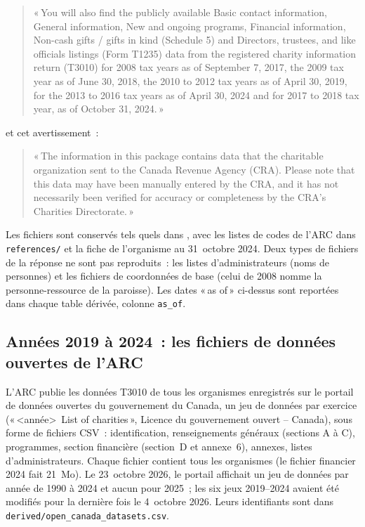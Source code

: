 \documentclass[11pt,letterpaper]{article}
\begin{document}
\begin{quote}\small
«\,You will also find the publicly available Basic contact information, General information, New and ongoing programs, Financial information, Non-cash gifts / gifts in kind (Schedule 5) and Directors, trustees, and like officials listings (Form T1235) data from the registered charity information return (T3010) for 2008 tax years as of September 7, 2017, the 2009 tax year as of June 30, 2018, the 2010 to 2012 tax years as of April 30, 2019, for the 2013 to 2016 tax years as of April 30, 2024 and for 2017 to 2018 tax year, as of October 31, 2024.\,»
\end{quote}

et cet avertissement~:

\begin{quote}\small
«\,The information in this package contains data that the charitable organization sent to the Canada Revenue Agency (CRA). Please note that this data may have been manually entered by the CRA, and it has not necessarily been verified for accuracy or completeness by the CRA's Charities Directorate.\,»
\end{quote}

Les fichiers sont conservés tels quels dans , avec les listes de codes de l'ARC dans \texttt{references/} et la fiche de l'organisme au 31~octobre 2024. Deux types de fichiers de la réponse ne sont pas reproduits~: les listes d'administrateurs (noms de personnes) et les fichiers de coordonnées de base (celui de 2008 nomme la personne-ressource de la paroisse). Les dates «\,as of\,» ci-dessus sont reportées dans chaque table dérivée, colonne \texttt{as\_of}.

\subsection{Années 2019 à 2024~: les fichiers de données ouvertes de l'ARC}\label{sec:open}

L'ARC publie les données T3010 de tous les organismes enregistrés sur le portail de données ouvertes du gouvernement du Canada, un jeu de données par exercice («\,\textless année\textgreater\ List of charities\,», Licence du gouvernement ouvert -- Canada), sous forme de fichiers CSV~: identification, renseignements généraux (sections A à C), programmes, section financière (section~D et annexe~6), annexes, listes d'administrateurs. Chaque fichier contient tous les organismes (le fichier financier 2024 fait 21~Mo). Le 23~octobre 2026, le portail affichait un jeu de données par année de 1990 à 2024 et aucun pour 2025~; les six jeux 2019--2024 avaient été modifiés pour la dernière fois le 4~octobre 2026. Leurs identifiants sont dans \texttt{derived/open\_canada\_datasets.csv}.
\end{document}
